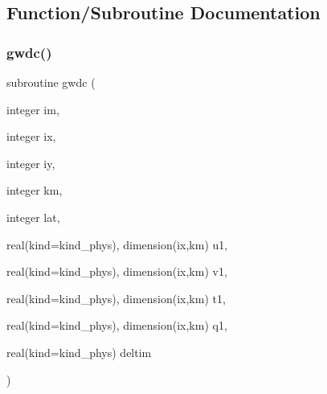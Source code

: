 \subsection{Function/\+Subroutine Documentation}
\mbox{\label{group___g_f_s__cgwd_ga722b7730110e3c91524ccf414eab9dfe}} 
\subsubsection{\texorpdfstring{gwdc()}{gwdc()}}
{\footnotesize\ttfamily subroutine gwdc (\begin{DoxyParamCaption}\item[{integer}]{im,  }\item[{integer}]{ix,  }\item[{integer}]{iy,  }\item[{integer}]{km,  }\item[{integer}]{lat,  }\item[{real(kind=kind\+\_\+phys), dimension(ix,km)}]{u1,  }\item[{real(kind=kind\+\_\+phys), dimension(ix,km)}]{v1,  }\item[{real(kind=kind\+\_\+phys), dimension(ix,km)}]{t1,  }\item[{real(kind=kind\+\_\+phys), dimension(ix,km)}]{q1,  }\item[{real(kind=kind\+\_\+phys)}]{deltim }\end{DoxyParamCaption})}


